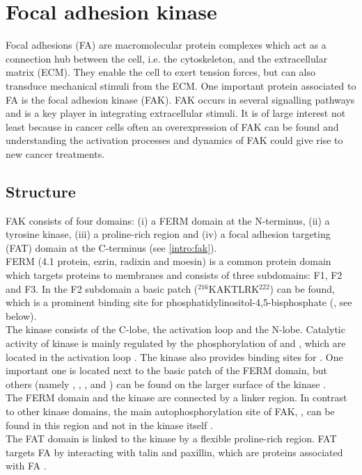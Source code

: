 \section{Focal adhesion kinase}
Focal adhesions (FA) are macromolecular protein complexes which act as a connection hub between the cell, i.e. the cytoskeleton, and the extracellular matrix (ECM). They enable the cell to exert tension forces, but can also transduce mechanical stimuli from the ECM. One important protein associated to FA is the focal adhesion kinase (FAK). FAK occurs in several signalling pathways and is a key player in integrating extracellular stimuli. It is of large interest not least because in cancer cells often an overexpression of FAK can be found and understanding the activation processes and dynamics of FAK could give rise to new cancer treatments.%
\subsection{Structure}
FAK consists of four domains: (i) a FERM domain at the N-terminus, (ii) a tyrosine kinase, (iii) a proline-rich region and (iv) a focal adhesion targeting (FAT) domain at the C-terminus (see \autoref{intro:fak}).\\
FERM (4.1 protein, ezrin, radixin and moesin) is a common protein domain which targets proteins to membranes \autocite{fermdomain} and consists of three subdomains: F1, F2 and F3. In the F2 subdomain a basic patch ($^{216}$KAKTLRK$^{222}$) can be found, which is a prominent binding site for phosphatidylinositol-4,5-bisphosphate (\pip, see below).\\
The kinase consists of the C-lobe, the activation loop and the N-lobe. Catalytic activity of kinase is mainly regulated by the phosphorylation of  and , which are located in the activation loop \autocite{tyrosinePhosphor}. The kinase also provides binding sites for \pip{}. One important one is located next to the basic patch of the FERM domain, but others (namely , , ,  and ) can be found on the larger surface of the kinase \autocites{pap002}{pap002Exp}.\\
The FERM domain and the kinase are connected by a linker region. In contrast to other kinase domains, the main autophosphorylation site of FAK, , can be found in this region and not in the kinase itself \autocite{pap001}.\\ %
The FAT domain is linked to the kinase by a flexible proline-rich region. FAT targets FA by interacting with talin and paxillin, which are proteins associated with FA \autocite{fatdomain}.
